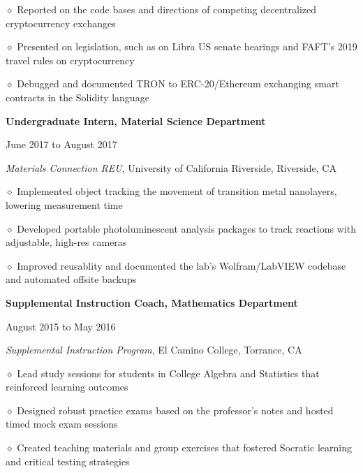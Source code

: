 \documentclass [11pt]{article}
\begin{document}
\begin{flushleft}
‭‭\quad\quad\quad$\diamond$ ‭Reported on the code bases and directions of competing decentralized cryptocurrency exchanges

‭‭\quad\quad\quad$\diamond$ Presented on legislation, such as on Libra US senate hearings and FAFT’s 2019 travel rules on cryptocurrency

‭‭\quad\quad\quad$\diamond$ Debugged and documented TRON to ERC-20/Ethereum exchanging smart contracts in the Solidity language

\linebreak
\textbf{Undergraduate Intern, Material Science Department}\begin{minipage}{0.535 \linewidth}\begin{flushright}June 2017 to August 2017\end{flushright}\end{minipage}
\emph{Materials Connection REU}, University of California Riverside, Riverside, CA

‭‭\quad\quad\quad$\diamond$ ‭Implemented object tracking the movement of transition metal nanolayers, lowering measurement time

‭‭\quad\quad\quad$\diamond$ Developed portable photoluminescent analysis packages to track reactions with adjustable, high-res cameras

‭‭\quad\quad\quad$\diamond$ Improved reusablity and documented the lab’s Wolfram/LabVIEW codebase and automated offsite backups

\linebreak
\textbf{Supplemental Instruction Coach, Mathematics Department}\begin{minipage}{0.475 \linewidth}\begin{flushright}August 2015 to May 2016\end{flushright}\end{minipage}
\emph{Supplemental Instruction Program}, El Camino College, Torrance, CA

‭‭\quad\quad\quad$\diamond$ ‭Lead study sessions for students in College Algebra and Statistics that reinforced learning outcomes

‭‭\quad\quad\quad$\diamond$ Designed robust practice exams based on the professor's notes and hosted timed mock exam sessions

‭‭\quad\quad\quad$\diamond$ Created teaching materials and group exercises that fostered Socratic learning and critical testing strategies

\linebreak


\end{flushleft}
\end{document}
